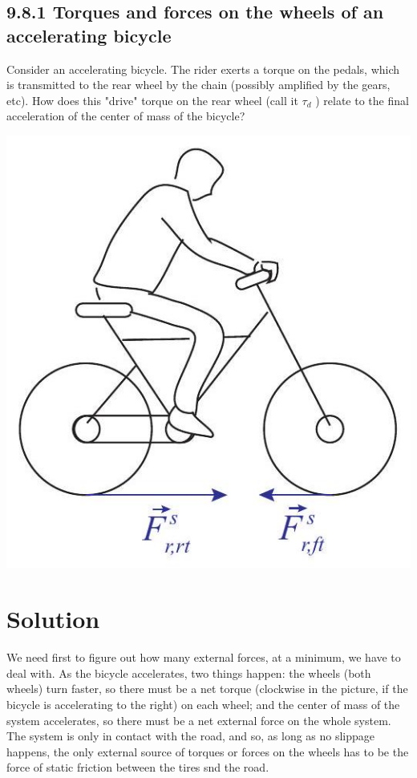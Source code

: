 \documentclass[10pt]{article}
\begin{document}
\subsection*{9.8.1 Torques and forces on the wheels of an accelerating bicycle}
Consider an accelerating bicycle. The rider exerts a torque on the pedals, which is transmitted to the rear wheel by the chain (possibly amplified by the gears, etc). How does this "drive" torque on the rear wheel (call it $\tau_{d}$ ) relate to the final acceleration of the center of mass of the bicycle?

\begin{center}
\includegraphics[max width=\textwidth]{2024_09_14_9969b06773f10b6936e8g-231}
\end{center}

\section*{Solution}
We need first to figure out how many external forces, at a minimum, we have to deal with. As the bicycle accelerates, two things happen: the wheels (both wheels) turn faster, so there must be a net torque (clockwise in the picture, if the bicycle is accelerating to the right) on each wheel; and the center of mass of the system accelerates, so there must be a net external force on the whole system. The system is only in contact with the road, and so, as long as no slippage happens, the only external source of torques or forces on the wheels has to be the force of static friction between the tires snd the road.
\end{document}
